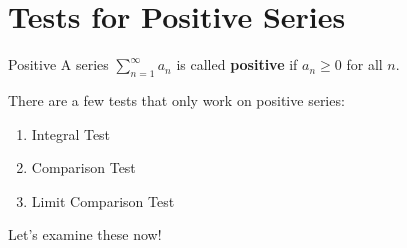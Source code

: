 \setcounter{section}{4}
\section{Tests for Positive Series}
\begin{Definition}{Positive}{}
    A series $ \sum\limits_{n=1}^{\infty} a_n $ is called \textbf{positive}
    if $ a_n\geqslant 0 $ for all $ n $.
\end{Definition}
There are a few tests that only work on positive series:
\begin{enumerate}[label=(\Roman*)]
    \item Integral Test
    \item Comparison Test
    \item Limit Comparison Test
\end{enumerate}
Let's examine these now!
